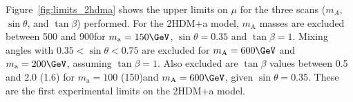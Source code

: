 

Figure~\ref{fig:limits_2hdma} shows the upper limits on $\mu$ for the three scans ($m_A$, $\sin\theta$, and $\tan\beta$) performed.
For the 2HDM+a model, $m_\text{A}$ masses are excluded between 500 and 900\GeV for $m_\text{a}=150\GeV$, $\sin\theta=0.35$ and $\tan\beta=1$. Mixing angles with $0.35<\sin\theta<0.75$ are excluded for $m_\text{A}=600\GeV$ and $m_\text{a}=200\GeV$, assuming $\tan\beta=1$. Also excluded are $\tan\beta$ values between 0.5 and 2.0 (1.6) for $m_\text{a}=100$ (150)\GeV and $m_\text{A}=600\GeV$, given $\sin\theta=0.35$. These are the first experimental limits on the 2HDM+a model.

